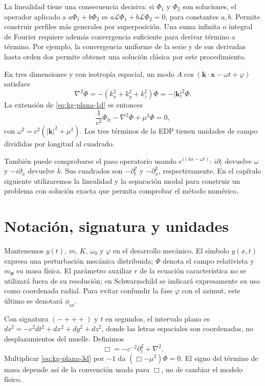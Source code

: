 La linealidad tiene una consecuencia decisiva: si $\Phi_1$ y $\Phi_2$
son soluciones, el operador aplicado a $a\Phi_1+b\Phi_2$ es
$a\mathcal L\Phi_1+b\mathcal L\Phi_2=0$, para constantes $a,b$.
Permite construir perfiles más generales por superposición. Una suma
infinita o integral de Fourier requiere además convergencia suficiente
para derivar término a término. Por ejemplo, la convergencia uniforme
de la serie y de sus derivadas hasta orden dos permite obtener una solución
clásica por este procedimiento.

En tres dimensiones y con isotropía espacial, un modo
$A\cos(\boldsymbol{k}\cdot\boldsymbol{x}-\omega t+\varphi)$ satisface
\[
\nabla^2\Phi=-(k_x^2+k_y^2+k_z^2)\Phi=-|\boldsymbol{k}|^2\Phi.
\]
La extensión de \eqref{eq:kg-plana-1d} es entonces
\begin{equation}
\frac1{c^2}\Phi_{tt}-\nabla^2\Phi+\mu^2\Phi=0,
\label{eq:kg-plana-3d}
\end{equation}
con $\omega^2=c^2(|\boldsymbol{k}|^2+\mu^2)$. Los tres términos de la
EDP tienen unidades de campo divididas por longitud al cuadrado.

También puede comprobarse el paso operatorio usando
$e^{i(kx-\omega t)}$: $i\partial_t$ devuelve $\omega$ y
$-i\partial_x$ devuelve $k$. Sus cuadrados son $-\partial_t^2$ y
$-\partial_x^2$, respectivamente.
En el capítulo siguiente utilizaremos la linealidad y la separación modal
para construir un problema con solución exacta que permita comprobar el
método numérico.

\section{Notación, signatura y unidades}
\label{sec:notacion-unidades}

Mantenemos $y(t)$, $m$, $K$, $\omega_0$ y $\varphi$ en el desarrollo
mecánico. El símbolo $y(x,t)$ expresa una perturbación mecánica distribuida; $\Phi$ denota el campo relativista y $m_\Phi$ su masa física.
El parámetro auxiliar $r$ de la ecuación característica no se utilizará
fuera de su resolución; en Schwarzschild se indicará expresamente su
uso como coordenada radial. Para evitar confundir la fase $\varphi$ con
el azimut, este último se denotará $\phi_{\mathrm{az}}$.

Con signatura $(-+++)$ y $t$ en segundos, el intervalo plano es
$ds^2=-c^2dt^2+dx^2+dy^2+dz^2$, donde las letras espaciales son coordenadas,
no desplazamientos del muelle. Definimos
\[
\Box=-c^{-2}\partial_t^2+\nabla^2.
\]
Multiplicar \eqref{eq:kg-plana-3d} por $-1$ da
$(\Box-\mu^2)\Phi=0$. El signo del término de masa depende así de la
convención usada para $\Box$, no de cambiar el modelo físico.

